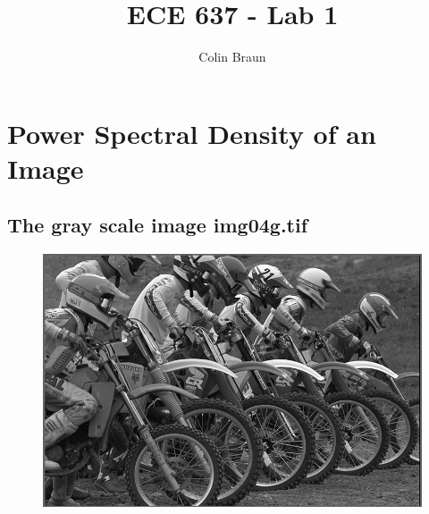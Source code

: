 \documentclass{article}
\title{ECE 637 - Lab 1}
\author{Colin Braun}
\begin{document}
\maketitle

\section{Power Spectral Density of an Image}
\subsection{The gray scale image img04g.tif}
\begin{figure}[H]
    \centering
    \includegraphics[width=1\textwidth]{../images/img04g.png}
    \begin{center}
    \end{center}
\end{figure}
\end{document}
